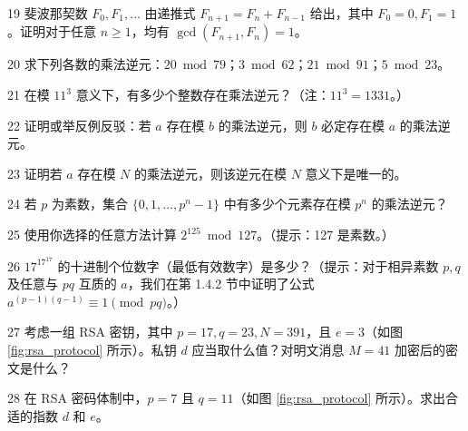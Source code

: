\begin{exercise}{19}
斐波那契数 $F_0, F_1, \dots$ 由递推式 $F_{n+1} = F_n + F_{n-1}$ 给出，其中 $F_0 = 0, F_1 = 1$。证明对于任意 $n \ge 1$，均有 $\gcd(F_{n+1}, F_n) = 1$。
\end{exercise}

\begin{exercise}{20}
求下列各数的乘法逆元：$20 \bmod 79$；$3 \bmod 62$；$21 \bmod 91$；$5 \bmod 23$。
\end{exercise}

\begin{exercise}{21}
在模 $11^3$ 意义下，有多少个整数存在乘法逆元？（注：$11^3 = 1331$。）
\end{exercise}

\begin{exercise}{22}
证明或举反例反驳：若 $a$ 存在模 $b$ 的乘法逆元，则 $b$ 必定存在模 $a$ 的乘法逆元。
\end{exercise}

\begin{exercise}{23}
证明若 $a$ 存在模 $N$ 的乘法逆元，则该逆元在模 $N$ 意义下是唯一的。
\end{exercise}

\begin{exercise}{24}
若 $p$ 为素数，集合 $\{0, 1, \dots, p^n - 1\}$ 中有多少个元素存在模 $p^n$ 的乘法逆元？
\end{exercise}

\begin{exercise}{25}
使用你选择的任意方法计算 $2^{125} \bmod 127$。（提示：127 是素数。）
\end{exercise}

\begin{exercise}{26}
$17^{17^{17}}$ 的十进制个位数字（最低有效数字）是多少？（提示：对于相异素数 $p, q$ 及任意与 $pq$ 互质的 $a$，我们在第 1.4.2 节中证明了公式 $a^{(p-1)(q-1)} \equiv 1 \pmod{pq}$。）
\end{exercise}

\begin{exercise}{27}
考虑一组 RSA 密钥，其中 $p = 17, q = 23, N = 391$，且 $e = 3$（如图 \ref{fig:rsa_protocol} 所示）。私钥 $d$ 应当取什么值？对明文消息 $M = 41$ 加密后的密文是什么？
\end{exercise}

\begin{exercise}{28}
在 RSA 密码体制中，$p = 7$ 且 $q = 11$（如图 \ref{fig:rsa_protocol} 所示）。求出合适的指数 $d$ 和 $e$。
\end{exercise}


